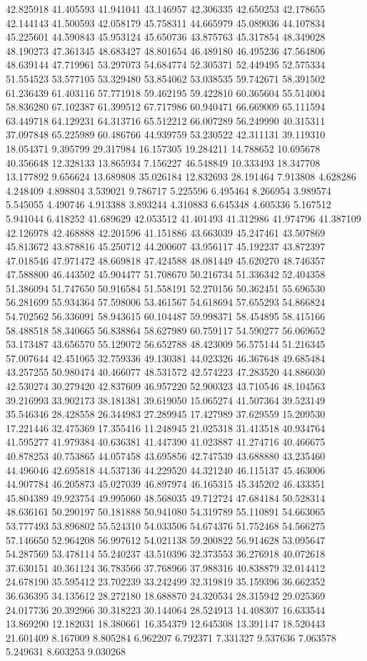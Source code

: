42.825918
41.405593
41.941041
43.146957
42.306335
42.650253
42.178655
42.144143
41.500593
42.058179
45.758311
44.665979
45.089036
44.107834
45.225601
44.590843
45.953124
45.650736
43.875763
45.317854
48.349028
48.190273
47.361345
48.683427
48.801654
46.489180
46.495236
47.564806
48.639144
47.719961
53.297073
54.684774
52.305371
52.449495
52.575334
51.554523
53.577105
53.329480
53.854062
53.038535
59.742671
58.391502
61.236439
61.403116
57.771918
59.462195
59.422810
60.365604
55.514004
58.836280
67.102387
61.399512
67.717986
60.940471
66.669009
65.111594
63.449718
64.129231
64.313716
65.512212
66.007289
56.249990
40.315311
37.097848
65.225989
60.486766
44.939759
53.230522
42.311131
39.119310
18.054371
9.395799
29.317984
16.157305
19.284211
14.788652
10.695678
40.356648
12.328133
13.865934
7.156227
46.548849
10.333493
18.347708
13.177892
9.656624
13.689808
35.026184
12.832693
28.191464
7.913808
4.628286
4.248409
4.898804
3.539021
9.786717
5.225596
6.495464
8.266954
3.989574
5.545055
4.490746
4.913388
3.893244
4.310883
6.645348
4.605336
5.167512
5.941044
6.418252
41.689629
42.053512
41.401493
41.312986
41.974796
41.387109
42.126978
42.468888
42.201596
41.151886
43.663039
45.247461
43.507869
45.813672
43.878816
45.250712
44.200607
43.956117
45.192237
43.872397
47.018546
47.971472
48.669818
47.424588
48.081449
45.620270
48.746357
47.588800
46.443502
45.904477
51.708670
50.216734
51.336342
52.404358
51.386094
51.747650
50.916584
51.558191
52.270156
50.362451
55.696530
56.281699
55.934364
57.598006
53.461567
54.618694
57.655293
54.866824
54.702562
56.336091
58.943615
60.104487
59.998371
58.454895
58.415166
58.488518
58.340665
56.838864
58.627989
60.759117
54.590277
56.069652
53.173487
43.656570
55.129072
56.652788
48.423009
56.575144
51.216345
57.007644
42.451065
32.759336
49.130381
44.023326
46.367648
49.685484
43.257255
50.980474
40.466077
48.531572
42.574223
47.283520
44.886030
42.530274
30.279420
42.837609
46.957220
52.900323
43.710546
48.104563
39.216993
33.902173
38.181381
39.619050
15.065274
41.507364
39.523149
35.546346
28.428558
26.344983
27.289945
17.427989
37.629559
15.209530
17.221446
32.475369
17.355416
11.248945
21.025318
31.413518
40.934764
41.595277
41.979384
40.636381
41.447390
41.023887
41.274716
40.466675
40.878253
40.753865
44.057458
43.695856
42.747539
43.688880
43.235460
44.496046
42.695818
44.537136
44.229520
44.321240
46.115137
45.463006
44.907784
46.205873
45.027039
46.897974
46.165315
45.345202
46.433351
45.804389
49.923754
49.995060
48.568035
49.712724
47.684184
50.528314
48.636161
50.290197
50.181888
50.941080
54.319789
55.110891
54.663065
53.777493
53.896802
55.524310
54.033506
54.674376
51.752468
54.566275
57.146650
52.964208
56.997612
54.021138
59.200822
56.914628
53.095647
54.287569
53.478114
55.240237
43.510396
32.373553
36.276918
40.072618
37.630151
40.361124
36.783566
37.768966
37.988316
40.838879
32.014412
24.678190
35.595412
23.702239
33.242499
32.319819
35.159396
36.662352
36.636395
34.135612
28.272180
18.688870
24.320534
28.315942
29.025369
24.017736
20.392966
30.318223
30.144064
28.524913
14.408307
16.633544
13.869290
12.182031
18.380661
16.354379
12.645308
13.391147
18.520443
21.601409
8.167009
8.805284
6.962207
6.792371
7.331327
9.537636
7.063578
5.249631
8.603253
9.030268
